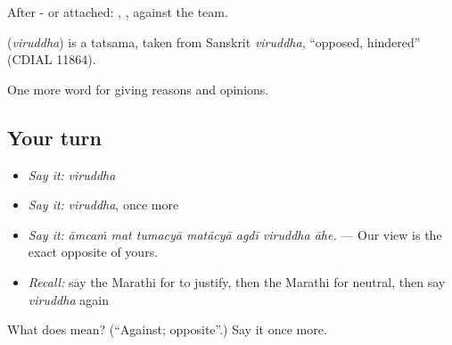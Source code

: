 After - or attached:  , , against the team.

\begin{cousinweb}
\textbf{} (\emph{viruddha}) is a tatsama, taken from Sanskrit \emph{viruddha}, \textquotedblleft{}opposed, hindered\textquotedblright{} (CDIAL 11864).
\end{cousinweb}

\begin{grammarlens}[title={What you've built}]
One more word for giving reasons and opinions.
\end{grammarlens}

\subsection*{Your turn}
\begin{itemize}
\raggedright
  \item \emph{Say it:} \emph{viruddha}
  \item \emph{Say it:} \emph{viruddha}, once more
  \item \emph{Say it:} \emph{āmcaṁ mat tumacyā matācyā agdī viruddha āhe.} — Our view is the exact opposite of yours.
  \item \emph{Recall:} say the Marathi for to justify, then the Marathi for neutral, then say \emph{viruddha} again
\end{itemize}

\begin{tcolorbox}[breakable,colback=teal!4,colframe=teal!35!black,title={Before you move on}]
What does  mean? (\textquotedblleft{}Against; opposite\textquotedblright{}.) Say it once more.
\end{tcolorbox}
